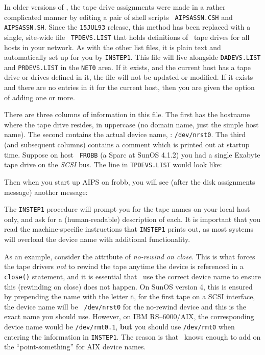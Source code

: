 \medskip{}

In older versions of \AIPS, the tape drive assignments were made in a
rather complicated manner by editing a pair of shell scripts {\tt
AIPSASSN.CSH} and {\tt AIPSASSN.SH}.  Since the {\tt 15JUL93}
release, this method has been replaced with a single, site-wide file {\tt
TPDEVS.LIST} that holds definitions of \AIPS\ tape drives for all hosts in
your network.  As with the other list files, it is plain text and
automatically set up for you by {\tt INSTEP1}.  This file will live
alongside {\tt DADEVS.LIST} and {\tt PRDEVS.LIST} in the {\tt\dol NET0} area.
If it exists, and the current host has a tape drive or drives defined in
it, the file will not be updated or modified.  If it exists and there are
no entries in it for the current host, then you are given the option of
adding one or more.

There are three columns of information in this file.  The first has the
hostname where the tape drive resides, in uppercase (no domain name,
just the simple host name).  The second contains the actual device name,
\eg: {\tt /dev/nrst0}.  The third (and subsequent columns) contains a
comment which is printed out at startup time.  Suppose on host {\tt
FROBB} (a Sparc at SunOS 4.1.2) you had a single Exabyte tape drive on
the {\it SCSI\/} bus.  The line in {\tt TPDEVS.LIST} would look like:
\medskip

\medskip

\noindent Then when you start up AIPS on frobb, you will see (after the
disk assignments message) another message:\medskip

\medskip

\noindent The {\tt INSTEP1} procedure will prompt you for the tape names
on your local host only, and ask for a (human-readable) description of
each.  It is important that you read the machine-specific instructions
that {\tt INSTEP1} prints out, as most systems will overload the device
name with additional functionality.

As an example, consider the attribute of {\it no-rewind on close\/}.
This is what forces the tape drivers {\it not\/} to rewind the tape
anytime the device is referenced in a {\tt close()} statement, and it is
essential that \AIPS\ use the correct device name to ensure this
(rewinding on close) does not happen.  On SunOS version 4, this is
ensured by prepending the name with the letter {\tt n}, \eg for the
first tape on a SCSI interface, the device name will be {\tt
/dev/nrst0} for the no-rewind device and this is the exact name you
should use.  However, on IBM RS--6000/AIX, the corresponding device name
would be {\tt /dev/rmt0.1}, {\bf but} you should use {\tt /dev/rmt0}
when entering the information in {\tt INSTEP1}.  The reason is that
\AIPS\ knows enough to add on the ``point-something'' for AIX device
names.

